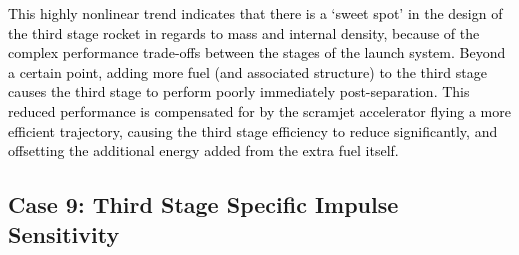 \textcolor{black}{This highly nonlinear trend indicates that there is a `sweet spot' in the design of the third stage rocket in regards to mass and internal density, because of the complex performance trade-offs between the stages of the launch system. Beyond a certain point, adding more fuel (and associated structure) to the third stage causes the third stage to perform poorly immediately post-separation. This reduced performance is compensated for by the scramjet accelerator flying a more efficient trajectory, causing the third stage efficiency to reduce significantly, and offsetting the additional energy added from the extra fuel itself.}

\subsection{Case 9: Third Stage Specific Impulse Sensitivity}\label{sec:isp3NoReturn}

